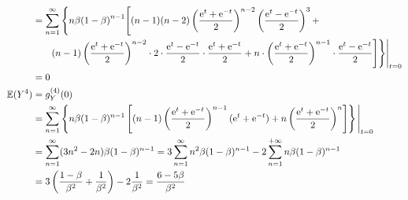 \begin{solution}[1]
\[\begin{aligned}
			                 & = \sum^{\infty}_{n=1}\Bigg\{ n\beta{(1-\beta)}^{n-1}\Bigg[(n-1)(n-2)\left(\frac{\mathrm{e}^t+\mathrm{e}^{-t}}{2}\right)^{n-2}\left(\frac{\mathrm{e}^t-\mathrm{e}^{-t}}{2}\right)^{3}+                                                                                \\
			                 & \qquad (n-1)\left(\frac{\mathrm{e}^t+\mathrm{e}^{-t}}{2}\right)^{n-2} \cdot 2 \cdot \frac{\mathrm{e}^t-\mathrm{e}^{-t}}{2} \cdot \frac{\mathrm{e}^t+\mathrm{e}^{-t}}{2} + n \cdot \left(\frac{\mathrm{e}^t+\mathrm{e}^{-t}}{2}\right)^{n-1} \cdot \frac{\mathrm{e}^t-\mathrm{e}^{-t}}{2} \Bigg] \Bigg\} \Bigg|_{t=0} \\
			                 & = 0                                                                                                                                                                                                                                  \\
			\mathbb{E}(Y^4)          & = g^{(4)}_Y(0)                                                                                                                                                                                                                       \\
			                 & = \sum^{\infty}_{n=1}\left\{n\beta(1-\beta)^{n-1}\left[(n-1)\left(\frac{\mathrm{e}^t+\mathrm{e}^{-t}}{2}\right)^{n-1}(\mathrm{e}^t+\mathrm{e}^{-t})+n\left(\frac{\mathrm{e}^t+\mathrm{e}^{-t}}{2}\right)^{n}\right]\right\} \Bigg|_{t=0}                                             \\
			                 & = \sum^{\infty}_{n=1}(3n^2-2n)\beta(1-\beta)^{n-1} = 3\sum^{\infty}_{n=1}n^2\beta(1-\beta)^{n-1} - 2\sum^{+\infty}_{n=1}n\beta(1-\beta)^{n-1}                                                                                        \\
			                 & = 3\left(\frac{1-\beta}{{\beta}^2} + \frac{1}{{\beta}^2}\right) - 2\frac{1}{{\beta}^2} = \frac{6-5\beta}{{\beta}^2}
		\end{aligned}\]
\end{solution}
